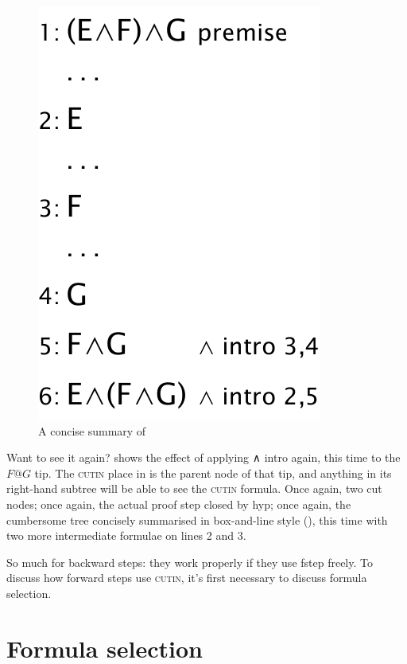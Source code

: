 \begin{figure}
\centering
\includegraphics[scale=0.5]{pics/I2L/andcutinbox2}
\caption{A concise summary of }
\label{fig:I2L:andcutinbox2}
\end{figure}

Want to see it again?  shows the effect of applying ∧ intro again, this time to the $F@G$ tip. The \textsc{cutin} place in  is the parent node of that tip, and anything in its right-hand subtree will be able to see the \textsc{cutin} formula. Once again, two cut nodes; once again, the actual proof step closed by hyp; once again, the cumbersome tree concisely summarised in box-and-line style (), this time with two more intermediate formulae on lines 2 and 3.

So much for backward steps: they work properly if they use fstep freely. To discuss how forward steps use \textsc{cutin}, it's first necessary to discuss formula selection.

\section{Formula selection}
\label{sec:I2L:formulaselection}

